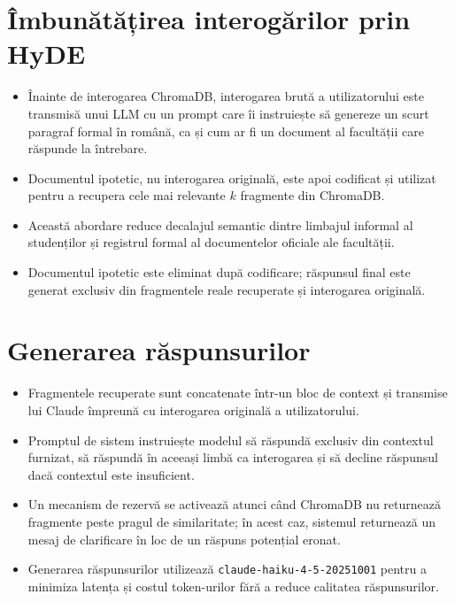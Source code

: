 \documentclass[12pt,a4paper]{report}
\begin{document}
\section{Îmbunătățirea interogărilor prin HyDE}
\begin{itemize}
    \item Înainte de interogarea ChromaDB, interogarea brută a utilizatorului este transmisă unui LLM cu un prompt care îi instruiește să genereze un scurt paragraf formal în română, ca și cum ar fi un document al facultății care răspunde la întrebare.
    \item Documentul ipotetic, nu interogarea originală, este apoi codificat și utilizat pentru a recupera cele mai relevante $k$ fragmente din ChromaDB.
    \item Această abordare reduce decalajul semantic dintre limbajul informal al studenților și registrul formal al documentelor oficiale ale facultății.
    \item Documentul ipotetic este eliminat după codificare; răspunsul final este generat exclusiv din fragmentele reale recuperate și interogarea originală.
\end{itemize}

\section{Generarea răspunsurilor}
\begin{itemize}
    \item Fragmentele recuperate sunt concatenate într-un bloc de context și transmise lui Claude împreună cu interogarea originală a utilizatorului.
    \item Promptul de sistem instruiește modelul să răspundă exclusiv din contextul furnizat, să răspundă în aceeași limbă ca interogarea și să decline răspunsul dacă contextul este insuficient.
    \item Un mecanism de rezervă se activează atunci când ChromaDB nu returnează fragmente peste pragul de similaritate; în acest caz, sistemul returnează un mesaj de clarificare în loc de un răspuns potențial eronat.
    \item Generarea răspunsurilor utilizează \texttt{claude-haiku-4-5-20251001} pentru a minimiza latența și costul token-urilor fără a reduce calitatea răspunsurilor.
\end{itemize}
\end{document}
